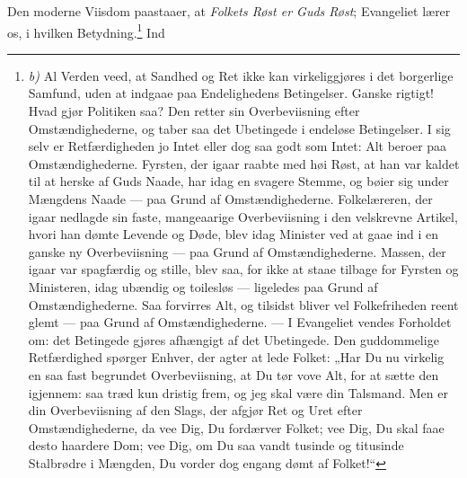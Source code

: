 \documentclass[12pt,a4paper]{book}
\begin{document}
Den moderne Viisdom paastaaer, at \emph{Folkets Røst er Guds Røst}; Evangeliet lærer
os, i hvilken Betydning.\footnote{\textit{b)} Al Verden veed, at Sandhed og Ret ikke kan
virkeliggjøres i det borgerlige Samfund, uden at indgaae paa Endelighedens Betingelser.
Ganske rigtigt! Hvad gjør Politiken saa? Den retter sin Overbeviisning efter
Omstændighederne, og taber saa det Ubetingede i endeløse Betingelser. I sig selv er
Retfærdigheden jo Intet eller dog saa godt som Intet: Alt beroer paa Omstændighederne.
Fyrsten, der igaar raabte med høi Røst, at han var kaldet til at herske af Guds Naade,
har idag en svagere Stemme, og bøier sig under Mængdens Naade --- paa Grund af
Omstændighederne. Folkelæreren, der igaar nedlagde sin faste, mangeaarige Overbeviisning
i den velskrevne Artikel, hvori han dømte Levende og Døde, blev idag Minister ved at
gaae ind i en ganske ny Overbeviisning --- paa Grund af Omstændighederne. Massen, der
igaar var spagfærdig og stille, blev saa, for ikke at staae tilbage for Fyrsten og
Ministeren, idag ubændig og toilesløs --- ligeledes paa Grund af Omstændighederne. Saa
forvirres Alt, og tilsidst bliver vel Folkefriheden reent glemt --- paa Grund af
Omstændighederne. --- I Evangeliet vendes Forholdet om: det Betingede gjøres afhængigt
af det Ubetingede. Den guddommelige Retfærdighed spørger Enhver, der agter at lede
Folket: „Har Du nu virkelig en saa fast begrundet Overbeviisning, at Du tør vove Alt,
for at sætte den igjennem: saa træd kun dristig frem, og jeg skal være din Talsmand.
Men er din Overbeviisning af den Slags, der afgjør Ret og Uret efter Omstændighederne,
da vee Dig, Du fordærver Folket; vee Dig, Du skal faae desto haardere Dom; vee Dig, om
Du saa vandt tusinde og titusinde Stalbrødre i Mængden, Du vorder dog engang dømt af
Folket!“} Ind\-%
\end{document}
